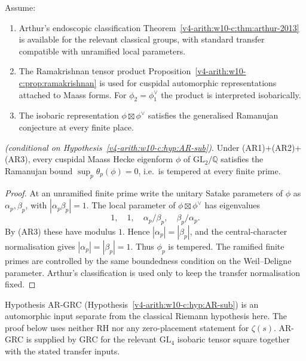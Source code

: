 \begin{hypothesis}
\label{v4-arith:w10-c:hyp:AR-sub}
Assume:
\begin{enumerate}
\item[(AR1)] Arthur's endoscopic classification
Theorem~\ref{v4-arith:w10-c:thm:arthur-2013} is available for the relevant
classical groups, with standard transfer compatible with unramified
local parameters.
\item[(AR2)] The Ramakrishnan tensor product
Proposition~\ref{v4-arith:w10-c:prop:ramakrishnan}
is used for cuspidal automorphic representations attached to Maass
forms. For \(\phi_{2}=\phi_{1}^{\vee}\) the product is interpreted
isobarically.
\item[(AR3)] The isobaric representation
\(\phi\boxtimes\phi^{\vee}\) satisfies the generalised Ramanujan
conjecture at every finite place.
\end{enumerate}
\end{hypothesis}

\begin{theorem}
\label{v4-arith:w10-c:thm:AR-implies-Ramanujan}
\emph{(conditional on
Hypothesis~\ref{v4-arith:w10-c:hyp:AR-sub})}. Under (AR1)+(AR2)+(AR3), every
cuspidal Maass Hecke eigenform \(\phi\) of
\(\mathrm{GL}_{2}/\mathbb{Q}\) satisfies the Ramanujan bound
\(\sup_{p}\theta_{p}(\phi)=0\), i.e.\ is tempered at every finite prime.
\end{theorem}

\begin{proof}
At an unramified finite prime write the unitary Satake parameters of
\(\phi\) as \(\alpha_{p},\beta_{p}\), with
\(|\alpha_{p}\beta_{p}|=1\). The local parameter of
\(\phi\boxtimes\phi^{\vee}\) has eigenvalues
\[
1,\quad 1,\quad \alpha_{p}/\beta_{p},\quad \beta_{p}/\alpha_{p}.
\]
By (AR3) these have modulus \(1\). Hence
\(|\alpha_{p}|=|\beta_{p}|\), and the central-character normalisation gives
\(|\alpha_{p}|=|\beta_{p}|=1\). Thus \(\phi_{p}\) is tempered.
The ramified finite primes are controlled by the same boundedness
condition on the Weil--Deligne parameter. Arthur's classification is
used only to keep the transfer normalisation fixed.
\end{proof}

\begin{proposition}
\label{v4-arith:w10-c:prop:sub-RH-strict}
Hypothesis AR-GRC
(Hypothesis~\ref{v4-arith:w10-c:hyp:AR-sub}) is an automorphic input separate
from the classical Riemann hypothesis here. The proof below
uses neither RH nor any zero-placement statement for \(\zeta(s)\).
AR-GRC is supplied by GRC for the relevant \(\mathrm{GL}_{4}\) isobaric
tensor square together with the stated transfer inputs.
\end{proposition}

